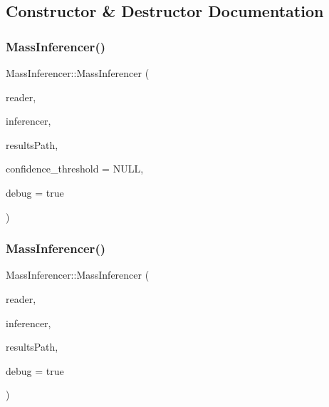 \subsection{Constructor \& Destructor Documentation}
\mbox{\label{class_mass_inferencer_aa1f9519adb814a99f8c20a5d28d2f4e9}} 
\subsubsection{\texorpdfstring{Mass\+Inferencer()}{MassInferencer()}\hspace{0.1cm}{\footnotesize\ttfamily [1/5]}}
{\footnotesize\ttfamily Mass\+Inferencer\+::\+Mass\+Inferencer (\begin{DoxyParamCaption}\item[{\hyperlink{_dataset_reader_8h_a30d89cba514a220d64d04535c0465f1c}{Dataset\+Reader\+Ptr}}]{reader,  }\item[{\hyperlink{_framework_inferencer_8h_a7b59ebc4b080d1be0d1a6240703011f2}{Framework\+Inferencer\+Ptr}}]{inferencer,  }\item[{const std\+::string \&}]{results\+Path,  }\item[{double $\ast$}]{confidence\+\_\+threshold = {\ttfamily NULL},  }\item[{bool}]{debug = {\ttfamily true} }\end{DoxyParamCaption})}

\mbox{\label{class_mass_inferencer_a358995e115d7c7a015620ca42df10fe9}} 
\subsubsection{\texorpdfstring{Mass\+Inferencer()}{MassInferencer()}\hspace{0.1cm}{\footnotesize\ttfamily [2/5]}}
{\footnotesize\ttfamily Mass\+Inferencer\+::\+Mass\+Inferencer (\begin{DoxyParamCaption}\item[{\hyperlink{_dataset_reader_8h_a30d89cba514a220d64d04535c0465f1c}{Dataset\+Reader\+Ptr}}]{reader,  }\item[{\hyperlink{_framework_inferencer_8h_a7b59ebc4b080d1be0d1a6240703011f2}{Framework\+Inferencer\+Ptr}}]{inferencer,  }\item[{const std\+::string \&}]{results\+Path,  }\item[{bool}]{debug = {\ttfamily true} }\end{DoxyParamCaption})}


